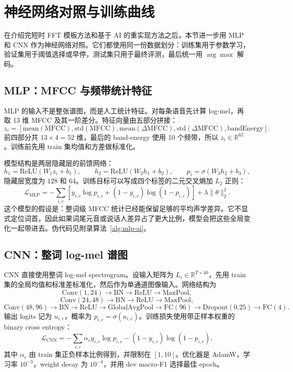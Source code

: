 \section{神经网络对照与训练曲线}

在介绍完短时 FFT 模板方法和基于 AI 的重实现方法之后，本节进一步用 MLP 和 CNN 作为神经网络对照。它们都使用同一份数据划分：训练集用于参数学习，验证集用于阈值选择或早停，测试集只用于最终评测，最后统一用 $\arg\max$ 解码。

\subsection{MLP：MFCC 与频带统计特征}

MLP 的输入不是整张谱图，而是人工统计特征。对每条语音先计算 log-mel，再取 13 维 MFCC 及其一阶差分。特征向量由五部分拼接：
\[
z_i=
\left[
\mathrm{mean}(\mathrm{MFCC}),
\mathrm{std}(\mathrm{MFCC}),
\mathrm{mean}(\Delta\mathrm{MFCC}),
\mathrm{std}(\Delta\mathrm{MFCC}),
\mathrm{bandEnergy}
\right].
\]
前四部分共 $13\times4=52$ 维，最后的 band-energy 使用 10 个频带，所以 $z_i\in\mathbb{R}^{62}$。训练前先用 train 集均值和方差做标准化。

模型结构是两层隐藏层的前馈网络：
\[
h_1=\mathrm{ReLU}(W_1z_i+b_1),\qquad
h_2=\mathrm{ReLU}(W_2h_1+b_2),\qquad
p_i=\sigma(W_3h_2+b_3),
\]
隐藏层宽度为 $128$ 和 $64$。训练目标可以写成四个标签的二元交叉熵加 $L_2$ 正则：
\[
\mathcal{L}_{\mathrm{MLP}}
=-\sum_{i,c}\left[y_{i,c}\log p_{i,c}+(1-y_{i,c})\log(1-p_{i,c})\right]
+\lambda\|\theta\|_2^2.
\]
这个模型的假设是：整词级 MFCC 统计已经能保留足够的平均声学差异。它不显式定位词首，因此如果词尾元音或说话人差异占了更大比例，模型会把这些全局变化一起带进去。伪代码见附录算法~\ref{alg:mlp-ai}。

\subsection{CNN：整词 log-mel 谱图}

CNN 直接使用整词 log-mel spectrogram。设输入矩阵为 $L_i\in\mathbb{R}^{T\times40}$，先用 train 集的全局均值和标准差标准化，然后作为单通道图像输入。网络结构为
\[
\mathrm{Conv}(1,24)\rightarrow \mathrm{BN}\rightarrow \mathrm{ReLU}\rightarrow \mathrm{MaxPool},
\]
\[
\mathrm{Conv}(24,48)\rightarrow \mathrm{BN}\rightarrow \mathrm{ReLU}\rightarrow \mathrm{MaxPool},
\]
\[
\mathrm{Conv}(48,96)\rightarrow \mathrm{BN}\rightarrow \mathrm{ReLU}\rightarrow
\mathrm{GlobalAvgPool}\rightarrow \mathrm{FC}(96)\rightarrow \mathrm{Dropout}(0.25)\rightarrow \mathrm{FC}(4).
\]
输出 logits 记为 $u_{i,c}$，概率为 $p_{i,c}=\sigma(u_{i,c})$。训练损失使用带正样本权重的 binary cross entropy：
\[
\mathcal{L}_{\mathrm{CNN}}
=-\sum_{i,c}\alpha_c y_{i,c}\log p_{i,c}
-(1-y_{i,c})\log(1-p_{i,c}),
\]
其中 $\alpha_c$ 由 train 集正负样本比例得到，并限制在 $[1,10]$。优化器是 AdamW，学习率 $10^{-3}$，weight decay 为 $10^{-4}$，并用 dev macro-F1 选择最佳 epoch。


